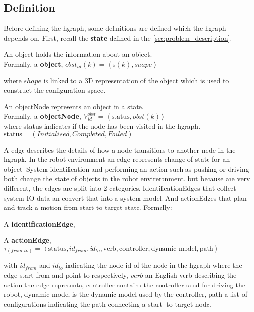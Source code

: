 \subsection{Definition}%
\label{subsec:hgraph_definition}
Before defining the \ac{hgraph}, some definitions are defined which the \ac{hgraph} depends on. First, recall the \textbf{state} defined in the \cref{sec:problem_description}.\bs

An object holds the information about an object.\\Formally, a \textbf{object},  $obst_{id}(k) = \left\langle s(k), shape \right\rangle $\bs

where $shape$ is linked to a 3D representation of the object which is used to construct the configuration space.\bs

An objectNode represents an object in a state.\\Formally, a \textbf{objectNode}, $V^{obst}_{id} =\left\langle \textrm{status}, obst(k)\right\rangle $\\where status indicates if the node has been visited in the hgraph. $\textrm{status} = (Initialised, Completed, Failed)$\bs

A edge describes the details of how a node transitions to another node in the \ac{hgraph}. In the robot environment an edge represents change of state for an object. System identification and performing an action such as pushing or driving both change the state of objects in the robot envireronment, but because are very different, the edges are split into 2 categories. IdentificationEdges that collect system \ac{IO} data an convert that into a system model. And actionEdges that plan and track a motion from start to target state. Formally:\bs

A \textbf{identificationEdge},

A \textbf{actionEdge}, $\tau_{(from, to)} = \left\langle \textrm{status}, id_{from}, id_{to}, \textrm{verb}, \textrm{controller},\textrm{dynamic model}, \textrm{path}\right\rangle$\bs

with $id_{from}$ and $id_{to}$ indicating the node id of the node in the \ac{hgraph} where the edge start from and point to respectively, $verb$ an English verb describing the action the edge represents, controller contains the controller used for driving the robot, dynamic model is the dynamic model used by the controller, path a list of configurations indicating the path connecting a start- to target node.\bs

